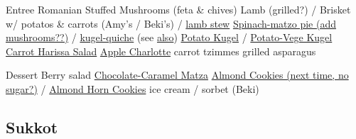 Entree
Romanian Stuffed Mushrooms (feta \& chives)
Lamb (grilled?) / Brisket w/ potatos & carrots (Amy's / Beki's) / \href{https://instantpoteats.com/instant-pot-leg-lamb-stew-dates-cinnamon/}{lamb stew}
\href{https://www.epicurious.com/recipes/food/views/spinach-and-matzoh-pie-242019}{Spinach-matzo pie (add mushrooms??)} / \href{https://www.myjewishlearning.com/the-nosher/quiche-with-veggie-crust-recipe/}{kugel-quiche} (see \href{https://toriavey.com/toris-kitchen/potato-crusted-spinach-frittata/}{also})
\href{https://smittenkitchen.com/2015/12/potato-kugel/}{Potato Kugel} / \href{https://www.epicurious.com/recipes/food/views/potato-carrot-and-zucchini-kugel-241904}{Potato-Vege Kugel}
\href{https://smittenkitchen.com/2010/05/carrot-salad-with-harissa-feta-and-mint/}{Carrot Harissa Salad}
\hyperref[Apple Matzo Charlotte]{Apple Charlotte}
carrot tzimmes
grilled asparagus

Dessert
Berry salad
\href{https://smittenkitchen.com/2009/04/chocolate-caramel-crackers/}{Chocolate-Caramel Matza}
\href{https://smittenkitchen.com/2009/04/chewy-amaretti-cookies/}{Almond Cookies (next time, no sugar?)} / \href{https://smittenkitchen.com/2017/04/almond-horn-cookies/}{Almond Horn Cookies}
ice cream / sorbet (Beki)

\subsection{Sukkot}
